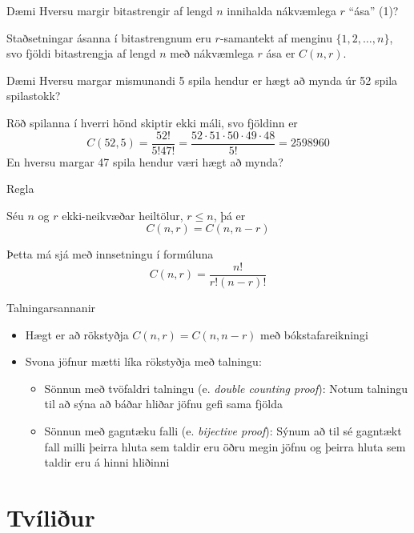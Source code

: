 \documentclass{beamer}
\begin{document}
\begin{frame}{Dæmi}
Hversu margir bitastrengir af lengd $n$ innihalda nákvæmlega $r$ ``ása'' (1)? \pause

Staðsetningar ásanna í bitastrengnum eru $r$-samantekt af menginu $\{1,2,\ldots,n\}$, svo fjöldi bitastrengja af lengd $n$ með nákvæmlega $r$ ása er $C(n, r)$.
\end{frame}

\begin{frame}{Dæmi}
Hversu margar mismunandi 5 spila hendur er hægt að mynda úr 52 spila spilastokk? \pause

Röð spilanna í hverri hönd skiptir ekki máli, svo fjöldinn er
\[
 C(52,5) = \frac{52!}{5!47!} = \frac{52\cdot51\cdot50\cdot49\cdot48}{5!} = 2598960
\]
\pause
En hversu margar 47 spila hendur væri hægt að mynda?
\end{frame}

\begin{frame}{Regla}
    \begin{tcolorbox}
        Séu $n$ og $r$ ekki-neikvæðar heiltölur, $r \leq n$, þá er
        \[
            C(n,r) = C(n,n-r)
        \]
    \end{tcolorbox}
Þetta má sjá með innsetningu í formúluna 
\[
 C(n,r) = \frac{n!}{r!(n-r)!}
\]
\end{frame}

\begin{frame}{Talningarsannanir}
\begin{itemize}
    \item Hægt er að rökstyðja $C(n,r) = C(n,n-r)$ með bókstafareikningi
    \item Svona jöfnur mætti líka rökstyðja með talningu:
    \begin{itemize}
        \item Sönnun með tvöfaldri talningu (e. \emph{double counting proof}): Notum talningu til að sýna að báðar hliðar jöfnu gefi sama fjölda
        \item Sönnun með gagntæku falli (e. \emph{bijective proof}): Sýnum að til sé gagntækt fall milli þeirra hluta sem taldir eru öðru megin jöfnu og þeirra hluta sem taldir eru á hinni hliðinni
    \end{itemize}
\end{itemize}
\end{frame}

\section{Tvíliður}
\end{document}
